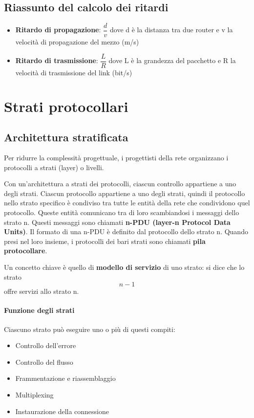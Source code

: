 \documentclass[11pt,a4paper]{book}
\begin{document}
\subsection{Riassunto del calcolo dei ritardi}
\begin{itemize}
	\item \textbf{Ritardo di propagazione}: $\dfrac{d}{v}$ dove d è la distanza tra due router e v la velocità di propagazione del mezzo (m/s)
	\item \textbf{Ritardo di trasmissione}: $\dfrac{L}{R}$ dove L è la grandezza del pacchetto e R la velocità di trasmissione del link (bit/s)
\end{itemize}

\section{Strati protocollari}
\subsection{Architettura stratificata}
Per ridurre la complessità progettuale, i progettisti della rete organizzano i protocolli a strati (layer) o livelli.

Con un'architettura a strati dei protocolli, ciascun controllo appartiene a uno degli strati. Ciascun protocollo appartiene a uno degli strati, quindi il protocollo nello strato specifico è condiviso tra tutte le entità della rete che condividono quel protocollo. Queste entità comunicano tra di loro scambiandosi i messaggi dello strato n. Questi messaggi sono chiamati \textbf{n-PDU (layer-n Protocol Data Units)}. Il formato di una n-PDU è definito dal protocollo dello strato n. Quando presi nel loro insieme, i protocolli dei bari strati sono chiamati \textbf{pila protocollare}.

Un concetto chiave è quello di \textbf{modello di servizio} di uno strato: si dice che lo strato $$n - 1$$ offre servizi allo strato n.
\paragraph{Funzione degli strati}
Ciascuno strato può eseguire uno o più di questi compiti:
\begin{itemize}
	\item Controllo dell’errore
	\item Controllo del flusso
	\item Frammentazione e riassemblaggio
	\item Multiplexing
	\item Instaurazione della connessione
\end{itemize}
\end{document}
